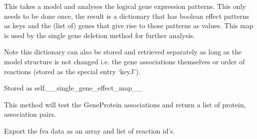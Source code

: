 \documentclass[letterpaper,12pt,english]{sphinxmanual}
\begin{document}
\begin{fulllineitems}
\begin{fulllineitems}
\label{\detokenize{api/core:cbmpy.CBModel.Model.createSingleGeneEffectMap}}
\pysigstartsignatures
\pysiglinewithargsret
{}
{}
{}
\pysigstopsignatures
\sphinxAtStartPar
This takes a model and analyses the logical gene expression patterns. This
only needs to be done once, the result is a dictionary that has boolean effect
patterns as keys and the (list of) genes that give rise to those patterns as
values. This map is used by the single gene deletion method for further
analysis.

\sphinxAtStartPar
Note this dictionary can also be stored and retrieved separately as long as the
model structure is not changed i.e. the gene associations themselves or order of
reactions (stored as the special entry ‘keyJ’).

\sphinxAtStartPar
Stored as self.\_\_single\_gene\_effect\_map\_\_

\end{fulllineitems}


\begin{fulllineitems}
\label{\detokenize{api/core:cbmpy.CBModel.Model.testGeneProteinAssociations}}
\pysigstartsignatures
\pysiglinewithargsret
{}
{}
{}
\pysigstopsignatures
\sphinxAtStartPar
This method will test the GeneProtein associations and return a list of
protein, association pairs.

\end{fulllineitems}


\begin{fulllineitems}
\label{\detokenize{api/core:cbmpy.CBModel.Model.exportFVAdata}}
\pysigstartsignatures
\pysiglinewithargsret
{}
{}
{}
\pysigstopsignatures
\sphinxAtStartPar
Export the fva data as an array and list of reaction id’s.

\end{fulllineitems}



\end{fulllineitems}
\end{document}
